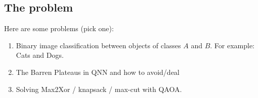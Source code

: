 \subsection{The problem}
Here are some problems (pick one):
\begin{enumerate}
    \item Binary image classification between objects of classes $A$ and $B$. For example: Cats and Dogs.
    \item The Barren Plateaus in QNN and how to avoid/deal
    \item Solving Max2Xor / knapsack / max-cut with QAOA.
\end{enumerate}